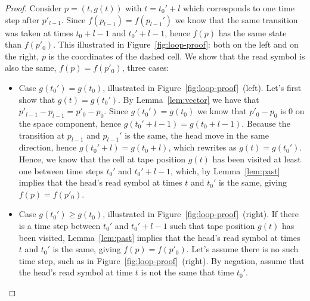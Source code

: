 \begin{proof}



    Consider $p = (t, g(t))$ with $t=t_0'+l$ which corresponds to one time step after $p'_{l-1}$. Since $f(p_{l-1}) = f(p_{l-1}')$ we know that the same transition was taken at times $t_0+l-1$ and $t_0'+l-1$, hence $f(p)$ has the same state than $f(p'_0)$. This illustrated in Figure~\ref{fig:loop-proof}: both on the left and on the right, $p$ is the coordinates of the dashed cell. We show that the read symbol is also the same, \ie $f(p) = f(p'_0)$, three cases:

    \begin{itemize}
        \item Case $g(t_0') = g(t_0)$, illustrated in Figure~\ref{fig:loop-proof}~(left). Let's first show that $g(t) = g(t_0')$. By Lemma~\ref{lem:vector} we have that $p'_{l-1} - p_{l-1} = p'_0 - p_0$. Since $g(t_0') = g(t_0)$ we know that $p'_0 - p_0$ is 0 on the space component, hence $g(t_0'+l-1) = g(t_0+l-1)$. Because the transition at $p_{l-1}$ and $p_{l-1}'$ is the same, the head move in the same direction, hence $g(t_0'+l) = g(t_0+l)$, which rewrites as $g(t) = g(t_0')$. Hence, we know that the cell at tape position $g(t)$ has been visited at least one between time steps $t_0'$ and $t_0'+l-1$, which, by Lemma~\ref{lem:past} implies that the head's read symbol at times $t$ and $t_0'$ is the same, giving $f(p) = f(p'_0)$.

        \item Case $g(t_0') \geq g(t_0)$, illustrated in Figure~\ref{fig:loop-proof}~(right). If there is a time step between $t_0'$ and $t_0'+l-1$ such that tape position $g(t)$ has been visited, Lemma~\ref{lem:past} implies that the head's read symbol at times $t$ and $t_0'$ is the same, giving $f(p) = f(p'_0)$. Let's assume there is no such time step, such as in Figure~\ref{fig:loop-proof}~(right). By negation, assume that the head's read symbol at time $t$ is not the same that time $t_0'$.
    \end{itemize}

\end{proof}




\newpage

